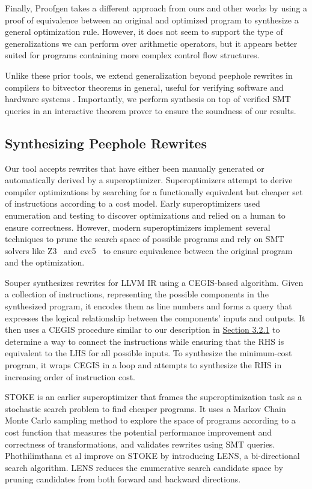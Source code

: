 \documentclass[review, anonymous, acmsmall]{acmart}
\begin{document}
Finally, Proofgen \cite{tate_generating_2010} takes a different approach from ours and other works by using a proof of equivalence between an original and optimized program to synthesize a general optimization rule. However, it does not seem to support the type of generalizations we can perform over arithmetic operators, but it appears better suited for programs containing more complex control flow structures. 

Unlike these prior tools, we extend generalization beyond peephole rewrites in compilers to bitvector theorems in general, useful for verifying software and hardware systems \cite{hutchison_tale_2014}. Importantly, we perform synthesis on top of verified SMT queries in an interactive theorem prover to ensure the soundness of our results. 

\subsection{Synthesizing Peephole Rewrites}
Our tool accepts rewrites that have either been manually generated or automatically derived by a superoptimizer. Superoptimizers attempt to derive compiler optimizations by searching for a functionally equivalent but cheaper set of instructions according to a cost model. Early superoptimizers \cite{massalin_superoptimizer_1987} used enumeration and testing to discover optimizations and relied on a human to ensure correctness. However, modern superoptimizers implement several techniques to prune the search space of possible programs and rely on SMT solvers like Z3~\cite{de_moura_z3_2008} and cvc5~\cite{barbosa_cvc5_2022} to ensure equivalence between the original program and the optimization. 

Souper \cite{sasnauskas_souper_2018} synthesizes rewrites for LLVM IR using a CEGIS-based algorithm. Given a collection of instructions, representing the possible components in the synthesized program, it encodes them as line numbers and forms a query that expresses the logical relationship between the components' inputs and outputs. It then uses a CEGIS procedure similar to our description in \hyperref[cegis]{Section 3.2.1} to determine a way to connect the instructions while ensuring that the RHS is equivalent to the LHS for all possible inputs. To synthesize the minimum-cost program, it wraps CEGIS in a loop and attempts to synthesize the RHS in increasing order of instruction cost. 


STOKE \cite{schkufza_stochastic_2013} is an earlier superoptimizer that frames the superoptimization task as a stochastic search problem to find cheaper programs. It uses a Markov Chain Monte Carlo sampling method to explore the space of programs according to a cost function that measures the potential performance improvement and correctness of transformations, and validates rewrites using SMT queries. Phothilimthana et al \cite{phothilimthana_scaling_2016} improve on STOKE by introducing LENS, a bi-directional search algorithm. LENS reduces the enumerative search candidate space by pruning candidates from both forward and backward directions.  
\end{document}
